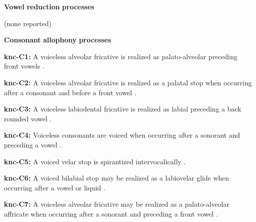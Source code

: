 \begin{styleBody}
\textbf{Vowel} \textbf{reduction} \textbf{processes}
\end{styleBody}

\begin{styleBody}
(none reported)
\end{styleBody}

\begin{styleBody}
\textbf{Consonant} \textbf{allophony} \textbf{processes}
\end{styleBody}

\begin{styleBody}
\textbf{knc-C1:} A voiceless alveolar fricative is realized as palato-alveolar preceding front vowels \citep[20]{Cyffer1998}.
\end{styleBody}

\begin{styleBody}
\textbf{knc-C2:} A voiceless alveolar fricative is realized as a palatal stop when occurring after a consonant and before a front vowel \citep[21]{Cyffer1998}.
\end{styleBody}

\begin{styleBody}
\textbf{knc-C3:} A voiceless labiodental fricative is realized as labial preceding a back rounded vowel \citep[23]{Cyffer1998}.
\end{styleBody}

\begin{styleBody}
\textbf{knc-C4:} Voiceless consonants are voiced when occurring after a sonorant and preceding a vowel \citep[22]{Cyffer1998}.
\end{styleBody}

\begin{styleBody}
\textbf{knc-C5:} A voiced velar stop is spirantized intervocalically \citep[22]{Cyffer1998}.
\end{styleBody}

\begin{styleBody}
\textbf{knc-C6:} A voiced bilabial stop may be realized as a labiovelar glide when occurring after a vowel or liquid \citep[22]{Cyffer1998}.
\end{styleBody}

\begin{styleBody}
\textbf{knc-C7:} A voiceless alveolar fricative may be realized as a palato-alveolar affricate when occurring after a sonorant and preceding a front vowel \citep[21]{Cyffer1998}.
\end{styleBody}

